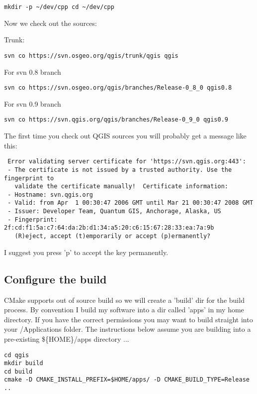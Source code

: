 \begin{verbatim}
mkdir -p ~/dev/cpp cd ~/dev/cpp 
\end{verbatim}

Now we check out the sources:

Trunk:

\begin{verbatim}
svn co https://svn.osgeo.org/qgis/trunk/qgis qgis 
\end{verbatim}

For svn 0.8 branch

\begin{verbatim}
svn co https://svn.osgeo.org/qgis/branches/Release-0_8_0 qgis0.8
\end{verbatim}

For svn 0.9 branch

\begin{verbatim}
svn co https://svn.qgis.org/qgis/branches/Release-0_9_0 qgis0.9
\end{verbatim}

The first time you check out QGIS sources you will probably get a message like
this:

\begin{verbatim}
 Error validating server certificate for 'https://svn.qgis.org:443':
 - The certificate is not issued by a trusted authority. Use the fingerprint to
   validate the certificate manually!  Certificate information:
 - Hostname: svn.qgis.org
 - Valid: from Apr  1 00:30:47 2006 GMT until Mar 21 00:30:47 2008 GMT
 - Issuer: Developer Team, Quantum GIS, Anchorage, Alaska, US
 - Fingerprint: 2f:cd:f1:5a:c7:64:da:2b:d1:34:a5:20:c6:15:67:28:33:ea:7a:9b
   (R)eject, accept (t)emporarily or accept (p)ermanently?  
\end{verbatim}

I suggest you press 'p' to accept the key permanently.

\subsection{Configure the build}
CMake supports out of source build so we will create a 'build' dir for the
build process. By convention I build my software into a dir called 'apps' in
my home directory. If you have the correct permissions you may want to build
straight into your /Applications folder. The instructions below assume you are
building into a pre-existing \$\{HOME\}/apps directory ...

\begin{verbatim}
cd qgis
mkdir build
cd build
cmake -D CMAKE_INSTALL_PREFIX=$HOME/apps/ -D CMAKE_BUILD_TYPE=Release ..
\end{verbatim}

